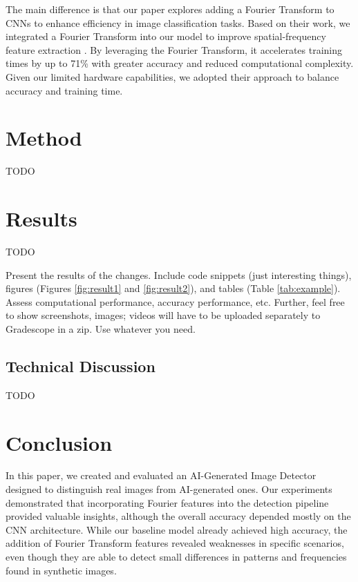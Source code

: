 The main difference is that our paper explores adding a Fourier Transform to CNNs to enhance efficiency in image classification tasks. Based on their work, we integrated a Fourier Transform into our model to improve spatial-frequency feature extraction \cite{4}. By leveraging the Fourier Transform, it accelerates training times by up to 71\% with greater accuracy and reduced computational complexity. Given our limited hardware capabilities, we adopted their approach to balance accuracy and training time.



\section{Method}

TODO


\section{Results}

TODO

Present the results of the changes. Include code snippets (just interesting things), figures (Figures \ref{fig:result1} and \ref{fig:result2}), and tables (Table \ref{tab:example}). Assess computational performance, accuracy performance, etc. Further, feel free to show screenshots, images; videos will have to be uploaded separately to Gradescope in a zip. Use whatever you need.




\subsection{Technical Discussion}

TODO


\section{Conclusion}

In this paper, we created and evaluated an AI-Generated Image Detector designed to distinguish real images from AI-generated ones. Our experiments demonstrated that incorporating Fourier features into the detection pipeline provided valuable insights, although the overall accuracy depended mostly on the CNN architecture. While our baseline model already achieved high accuracy, the addition of Fourier Transform features revealed weaknesses in specific scenarios, even though they are able to detect small differences in patterns and frequencies found in synthetic images.

